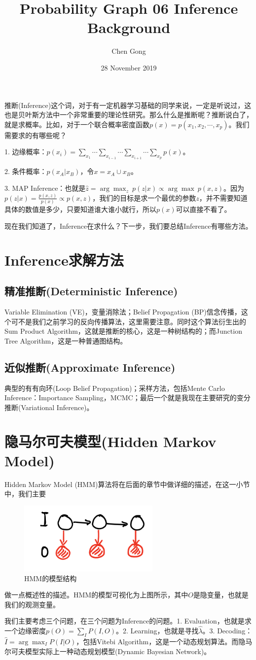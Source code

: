 \documentclass[a4paper]{article}
\title{Probability Graph 06 Inference Background}
\author{Chen Gong}
\date{28 November 2019}
\begin{document}
\maketitle
推断(Inference)这个词，对于有一定机器学习基础的同学来说，一定是听说过，这也是贝叶斯方法中一个非常重要的理论性研究。那么什么是推断呢？推断说白了，就是求概率。比如，对于一个联合概率密度函数$p(x)=p(x_1,x_2,\cdots,x_p)$。我们需要求的有哪些呢？

1. 边缘概率：$p(x_i) = \sum_{x_1}\cdots\sum_{x_{i-1}}\cdots\sum_{x_{i+1}}\cdots\sum_{x_p}p(x)$。

2. 条件概率：$p(x_A|x_B)$，令$x=x_A\cup x_B$。

3. MAP Inference：也就是$\hat{z} = \arg\max_z\ p(z|x) \varpropto \arg\max \ p(x,z)$。因为$p(z|x) = \frac{p(x,z)}{p(x)} \varpropto p(x,z)$，我们的目标是求一个最优的参数$z$，并不需要知道具体的数值是多少，只要知道谁大谁小就行，所以$p(x)$可以直接不看了。

现在我们知道了，Inference在求什么？下一步，我们要总结Inference有哪些方法。

\section{Inference求解方法}
\subsection{精准推断(Deterministic Inference)}
Variable Elimination (VE)，变量消除法；Belief Propagation (BP)信念传播，这个可不是我们之前学习的反向传播算法，这里需要注意。同时这个算法衍生出的Sum Product Algorithm，这就是推断的核心，这是一种树结构的；而Junction Tree Algorithm，这是一种普通图结构。

\subsection{近似推断(Approximate Inference)}
典型的有有向环(Loop Belief Propagation)；采样方法，包括Mente Carlo Inference：Importance Sampling，MCMC；最后一个就是我现在主要研究的变分推断(Variational Inference)。

\section{隐马尔可夫模型(Hidden Markov Model)}
Hidden Markov Model (HMM)算法将在后面的章节中做详细的描述，在这一小节中，我们主要
\begin{figure}[H]
    \centering
    \includegraphics[width=.3\textwidth]{微信图片_20191128115946.png}
    \caption{HMM的模型结构}
    \label{fig:my_label_1}
\end{figure}
做一点概述性的描述。HMM的模型可视化为上图所示，其中$O$是隐变量，也就是我们的观测变量。

我们主要考虑三个问题，在三个问题为Inference的问题。1. Evaluation，也就是求一个边缘密度$p(O) = \sum_I P(I,O)$。2. Learning，也就是寻找$\hat{\lambda}$。3. Decoding：$\hat{I} = \arg\max_I P(I|O)$，包括Vitebi Algorithm，这是一个动态规划算法。而隐马尔可夫模型实际上一种动态规划模型(Dynamic Bayesian Network)。
\end{document}
